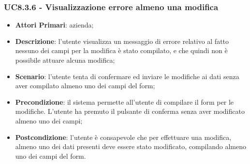 \subsubsection{UC8.3.6 - Visualizzazione errore almeno una modifica}
\begin{itemize}
	\item \textbf{Attori Primari}: azienda;
	\item \textbf{Descrizione}:
	l'utente visualizza un messaggio di errore relativo al fatto nessuno dei campi per la modifica è stato compilato, e che quindi non è possibile attuare alcuna modifica;
	\item \textbf{Scenario}: l'utente tenta di confermare ed inviare le modifiche ai dati senza aver compilato almeno uno dei campi del form;
	\item \textbf{Precondizione}: il sistema permette all'utente di compilare il form per le modifiche. L'utente ha premuto il pulsante di conferma senza aver modificato almeno uno dei campi; 
	\item \textbf{Postcondizione}:
	l'utente è consapevole che per effettuare una modifica, almeno uno dei dati presenti deve essere stato modificato, compilando almeno uno dei campi del form.
\end{itemize}

